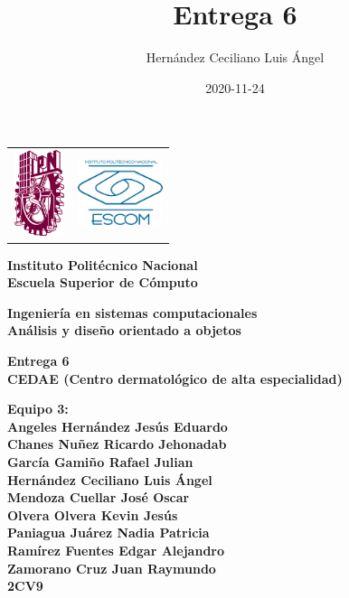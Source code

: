 \documentclass[12pt,letterpaper]{article}
\author{Hern\'andez Ceciliano Luis \'Angel}
\title{Entrega 6}
\date {2020-11-24}
\begin{document}
	\pagestyle{plain}
	{

		{
			\begin{tabular}
				{
					p{} 
					p{} 
				}
				\includegraphics[width=1.5cm, height=2.5cm]{ipn.png} &  
				\includegraphics[width=2.5cm, height=2cm]{escom.png}
			\end{tabular}
		}

		\begin{center}

			\par\vspace{1cm} %
			{
				\Huge\textbf
				{
					Instituto Polit\'ecnico Nacional 
					\\[.2cm]Escuela Superior de C\'omputo
				}
			}

			\par\vspace{0.5cm}
			{
				\large\textbf
				{
					Ingenier\'ia en sistemas computacionales 
					\\[.5cm]An\'alisis y diseño orientado a objetos
				}
			}

			\vfill

			\par\vspace{0.7cm}
			{
				\textbf
				{
					Entrega 6 \\
                    CEDAE (Centro dermatológico de alta especialidad)
				}
			}

			\vfill

			\par\vspace{0.7cm}
			{
				\textbf
				{
                    Equipo 3:
                    \\Angeles Hernández Jesús Eduardo
                    \\Chanes Nuñez Ricardo Jehonadab
                    \\García Gamiño Rafael Julian
                    \\Hernández Ceciliano Luis Ángel
                    \\Mendoza Cuellar José Oscar
                    \\Olvera Olvera Kevin Jesús
                    \\Paniagua Juárez Nadia Patricia
                    \\Ramírez Fuentes Edgar Alejandro
                    \\Zamorano Cruz Juan Raymundo
					\\2CV9
				} 
			}


\end{center}}
\end{document}
